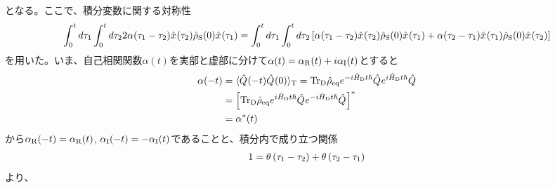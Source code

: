 \documentclass[10pt, a4paper]{jsarticle}
\begin{document}
となる。ここで、積分変数に関する対称性
\begin{equation}
\begin{split}
\label{eq:507}
		\int_{0}^{t} d\tau_{1} \int_{0}^{t} d\tau_{2} 2 \alpha(\tau_{1} - \tau_{2}) \hat{x}_{}(\tau_{2}) \hat{\rho}_{\rm S}(0) \hat{x}_{}(\tau_{1}) = \int_{0}^{t} d\tau_{1} \int_{0}^{t} d\tau_{2} \left[ \alpha(\tau_{1} - \tau_{2}) \hat{x}_{}(\tau_{2}) \hat{\rho}_{\rm S}(0) \hat{x}_{}(\tau_{1}) + \alpha(\tau_{2} - \tau_{1}) \hat{x}_{}(\tau_{1}) \hat{\rho}_{\rm S}(0) \hat{x}_{}(\tau_{2}) \right]
\end{split}
\end{equation}
を用いた。いま、自己相関関数$\alpha(t)$を実部と虚部に分けて$\alpha(t) = \alpha_{\rm R}(t) + i \alpha_{\rm I}(t)$とすると
\begin{equation}
\begin{split}
\label{eq:508}
		\alpha(-t) &= \langle \hat{Q}_{}(-t) \hat{Q}_{}(0) \rangle_{\rm T} = {\rm Tr}_{\rm D}\hat{\rho}_{\rm eq} e^{- i \hat{H}_{\rm D} t \hbar} \hat{Q}_{} e^{i \hat{H}_{\rm D} t \hbar} \hat{Q}_{} \\
			&= \left[ {\rm Tr}_{\rm D}\hat{\rho}_{\rm eq} e^{i \hat{H}_{\rm D} t \hbar} \hat{Q}_{} e^{- i \hat{H}_{\rm D} t \hbar} \hat{Q}_{} \right]^{*} \\
			&= \alpha^{*}(t)
\end{split}
\end{equation}
から$\alpha_{\rm R}(-t) = \alpha_{\rm R}(t)$, $\alpha_{\rm I}(-t) = - \alpha_{\rm I}(t)$であることと、積分内で成り立つ関係
\begin{equation}
\begin{split}
\label{eq:509}
	1 = \theta \left( \tau_{1} - \tau_{2} \right) + \theta \left( \tau_{2} - \tau_{1} \right)
\end{split}
\end{equation}
より、
\end{document}
